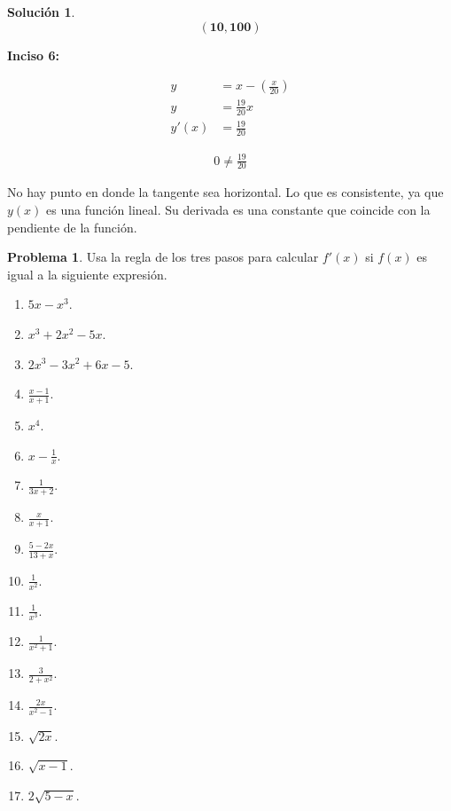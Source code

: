 \documentclass{article}
\theoremstyle{definition}
\newtheorem{problem}{Problema}
\newtheorem*{solution}{Solución}
\begin{document}
\begin{solution}
    \[
        \mathbf{(10,100)}
    \]

\textbf{Inciso 6:}

    \begin{align*}
        y &= x-(\frac{x}{20}) \\
        y &= \frac{19}{20}x \\
        y'(x) &= \frac{19}{20}
    \end{align*}

    \begin{align*}
        0 \neq \frac{19}{20}
    \end{align*}

No hay punto en donde la tangente sea horizontal. Lo que es consistente, ya que \( y(x) \) es una función lineal. Su derivada es una constante que coincide con la pendiente de la función.

\end{solution}

\bigskip

\begin{problem}
Usa la regla de los tres pasos para calcular \( f'(x) \) si \( f(x) \) es igual a la siguiente expresión.
\begin{enumerate}
    \item \( 5x - x^3 \).
    \item \( x^3 + 2x^2 - 5x \).
    \item \( 2x^3 - 3x^2 + 6x - 5 \).
    \item \( \frac{x - 1}{x + 1} \).
    \item \( x^4 \).
    \item \( x - \frac{1}{x} \).
    \item \( \frac{1}{3x+2} \).
    \item \( \frac{x}{x+1} \).
    \item \( \frac{5-2x}{13+x} \).
    \item \( \frac{1}{x^2} \).
    \item \( \frac{1}{x^3} \).
    \item \( \frac{1}{x^2+1} \).
    \item \( \frac{3}{2 + x^2} \).
    \item \( \frac{2x}{x^2 - 1} \).
    \item \( \sqrt{2x} \).  
    \item \( \sqrt{x - 1} \).
    \item \( 2\sqrt{5 - x} \).
\end{enumerate}
\end{problem}
\end{document}
